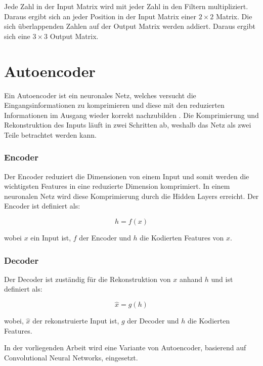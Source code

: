 Jede Zahl in der Input Matrix wird mit jeder Zahl in den Filtern multipliziert. Daraus ergibt sich an jeder Position in der Input Matrix einer
$ 2 \times 2 $ Matrix. Die sich überlappenden Zahlen auf der Output Matrix werden addiert. Daraus ergibt sich eine $ 3 \times 3 $ Output Matrix.

\section{Autoencoder}
Ein Autoencoder ist ein neuronales Netz, welches versucht die Eingangsinformationen zu komprimieren und diese mit den reduzierten Informationen
im Ausgang wieder korrekt nachzubilden \cite{was-ist-autoencoder}. Die Komprimierung und Rekonstruktion des Inputs läuft in zwei Schritten ab,
weshalb das Netz als zwei Teile betrachtet werden kann.
\\
\subsubsection{Encoder}
Der Encoder reduziert die Dimensionen von einem Input und somit werden die wichtigsten Features in eine reduzierte Dimension komprimiert.
In einem neuronalen Netz wird diese Komprimierung durch die Hidden Layers erreicht. Der Encoder ist definiert als:

\begin{equation}
  h = f(x)
\end{equation}

wobei $x$ ein Input ist, $f$ der Encoder und $h$ die Kodierten Features von $x$.

\subsubsection{Decoder}
Der Decoder ist zuständig für die Rekonstruktion von $x$ anhand $h$ und ist definiert als:

\begin{equation}
  \hat{x} = g(h)
\end{equation}

wobei, $\hat{x}$ der rekonstruierte Input ist, $g$ der Decoder und $h$ die Kodierten Features.

In der vorliegenden Arbeit wird eine Variante von Autoencoder, basierend auf Convolutional Neural Networks, eingesetzt.

